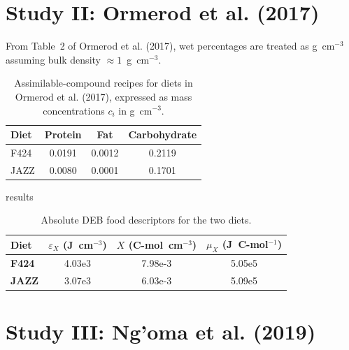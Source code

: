 \documentclass[11pt]{article}
\begin{document}
\section*{Study II: Ormerod et al. (2017)}

From Table~2 of Ormerod et al. (2017), wet percentages are treated as g~cm$^{-3}$ assuming bulk density $\approx 1$~g~cm$^{-3}$.

\begin{table}[h]
  \centering
  \begin{tabular}{lS[table-format=1.4]S[table-format=1.4]S[table-format=1.4]}
    \toprule
    Diet & {Protein} & {Fat} & {Carbohydrate} \\
    \midrule
    F424 & 0.0191 & 0.0012 & 0.2119 \\
    JAZZ & 0.0080 & 0.0001 & 0.1701 \\
    \bottomrule
  \end{tabular}
  \caption{Assimilable-compound recipes for diets in Ormerod et al. (2017), expressed as mass concentrations $c_i$ in g~cm$^{-3}$.}
\end{table}

results

\begin{table}[h]
  \centering
  \begin{tabular}{lS[table-format=1.2e1]S[table-format=1.2e-2]S[table-format=1.2e5]}
    \toprule
    Diet & {$\varepsilon_X$ (J~cm$^{-3}$)} & {$X$ (C-mol~cm$^{-3}$)} & {$\mu_X$ (J~C-mol$^{-1}$)} \\
    \midrule
    \textbf{F424} & 4.03e3 & 7.98e-3 & 5.05e5 \\
    \textbf{JAZZ} & 3.07e3 & 6.03e-3 & 5.09e5 \\
    \bottomrule
  \end{tabular}
  \caption{Absolute DEB food descriptors for the two diets.}
\end{table}

\section*{Study III: Ng’oma et al. (2019)}
\end{document}
